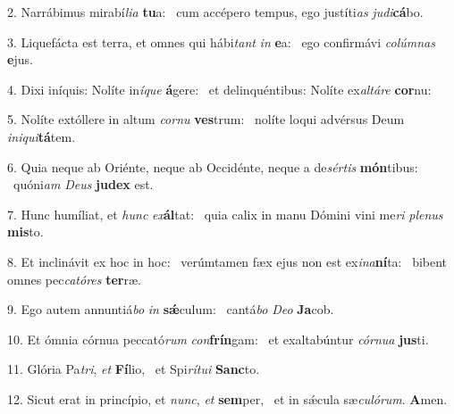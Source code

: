 2. Narrábimus mirabí\textit{li}\textit{a} \textbf{tu}a: \ast\  cum accépero tempus, ego justíti\textit{as} \textit{ju}\textit{di}\textbf{cá}bo.\

3. Liquefácta est terra, et omnes qui hábi\textit{tant} \textit{in} \textbf{e}a: \ast\  ego confirmávi \textit{co}\textit{lúm}\textit{nas} \textbf{e}jus.\

4. Dixi iníquis: Nolíte in\textit{í}\textit{que} \textbf{á}gere: \ast\  et delinquéntibus: Nolíte ex\textit{al}\textit{tá}\textit{re} \textbf{cor}nu:\

5. Nolíte extóllere in altum \textit{cor}\textit{nu} \textbf{ves}trum: \ast\  nolíte loqui advérsus Deum \textit{in}\textit{i}\textit{qui}\textbf{tá}tem.\

6. Quia neque ab Oriénte, neque ab Occidénte, neque a de\textit{sér}\textit{tis} \textbf{món}tibus: \ast\  quóni\textit{am} \textit{De}\textit{us} \textbf{ju}\textbf{dex} est.\

7. Hunc humíliat, et \textit{hunc} \textit{ex}\textbf{ál}tat: \ast\  quia calix in manu Dómini vini me\textit{ri} \textit{ple}\textit{nus} \textbf{mis}to.\

8. Et inclinávit ex hoc in hoc: \dag\  verúmtamen fæx ejus non est ex\textit{i}\textit{na}\textbf{ní}ta: \ast\  bibent omnes pec\textit{ca}\textit{tó}\textit{res} \textbf{ter}ræ.\

9. Ego autem annuntiá\textit{bo} \textit{in} \textbf{sǽ}culum: \ast\  cantá\textit{bo} \textit{De}\textit{o} \textbf{Ja}cob.\

10. Et ómnia córnua peccató\textit{rum} \textit{con}\textbf{frín}gam: \ast\  et exaltabúntur \textit{cór}\textit{nu}\textit{a} \textbf{jus}ti.\

11. Glória Pa\textit{tri}, \textit{et} \textbf{Fí}lio, \ast\  et Spi\textit{rí}\textit{tu}\textit{i} \textbf{Sanc}to.\

12. Sicut erat in princípio, et \textit{nunc}, \textit{et} \textbf{sem}per, \ast\  et in sǽcula sæ\textit{cu}\textit{ló}\textit{rum}. \textbf{A}men.\

